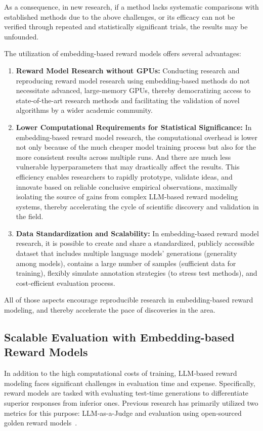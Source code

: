 As a consequence, in new research, if a method lacks systematic comparisons with established methods due to the above challenges, or its efficacy can not be verified through repeated and statistically significant trials, the results may be unfounded. 

The utilization of embedding-based reward models offers several advantages: \begin{enumerate}[nosep,leftmargin=*] 
\item \textbf{Reward Model Research without GPUs:} Conducting research and reproducing reward model research using embedding-based methods do not necessitate advanced, large-memory GPUs, thereby democratizing access to state-of-the-art research methods and facilitating the validation of novel algorithms by a wider academic community. 
\item \textbf{Lower Computational Requirements for Statistical Significance:} In embedding-based reward model research, the computational overhead is lower not only because of the much cheaper model training process but also for the more consistent results across multiple runs. And there are much less vulnerable hyperparameters that may drastically affect the results. This efficiency enables researchers to rapidly prototype, validate ideas, and innovate based on reliable conclusive empirical observations, maximally isolating the source of gains from complex LLM-based reward modeling systems, thereby accelerating the cycle of scientific discovery and validation in the field. 
\item \textbf{Data Standardization and Scalability:} In embedding-based reward model research, it is possible to create and share a standardized, publicly accessible dataset that includes multiple language models' generations (generality among models), contains a large number of samples (sufficient data for training), flexibly simulate annotation strategies (to stress test methods), and cost-efficient evaluation process.
\end{enumerate}


All of those aspects encourage reproducible research in embedding-based reward modeling, and thereby accelerate the pace of discoveries in the area.

\subsection{Scalable Evaluation with Embedding-based Reward Models}
\label{sec:scalable_evaluation}
In addition to the high computational costs of training, LLM-based reward modeling faces significant challenges in evaluation time and expense. Specifically, reward models are tasked with evaluating test-time generations to differentiate superior responses from inferior ones. Previous research has primarily utilized two metrics for this purpose: LLM-as-a-Judge and evaluation using open-sourced golden reward models~\citep{dong2023raft,dong2024rlhf}.

